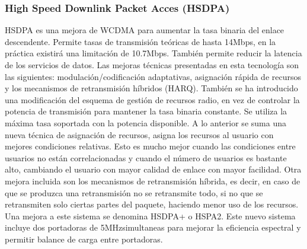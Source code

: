 \subsubsection{High Speed Downlink Packet Acces (\acrshort{HSDPA})}
\label{ssub:HSDPA}
\acrshort{HSDPA} es una mejora de WCDMA para aumentar la tasa binaria del enlace descendente. Permite tasas de transmisión teóricas de hasta 14Mbps, en la práctica existirá una limitación de 10.7Mbps. También permite reducir la latencia de los servicios de datos. Las mejoras técnicas presentadas en esta tecnología son las siguientes: modulación/codificación adaptativas, asignación rápida de recursos y los mecanismos de retransmisión híbridos (\acrshort{HARQ}). También se ha introducido una modificación del esquema de gestión de recursos radio, en vez de controlar la potencia de transmisión para mantener la tasa binaria constante. Se utiliza la máxima tasa soportada con la potencia disponible. A lo anterior se suma una nueva técnica de asignación de recursos, asigna los recursos al usuario con mejores condiciones relativas. Esto es mucho mejor cuando las condiciones entre usuarios no están correlacionadas y cuando el número de usuarios es bastante alto, cambiando el usuario con mayor calidad de enlace con mayor facilidad. Otra mejora incluida son los mecanismos de retransmisión híbrida, es decir, en caso de que se produzca una retransmisión no se retransmite todo, si no que se retransmiten solo ciertas partes del paquete, haciendo menor uso de los recursos.\\
Una mejora a este sistema se denomina \acrshort{HSDPA}+ o HSPA2. Este nuevo sistema incluye dos portadoras de 5MHzsimultaneas para mejorar la eficiencia espectral y permitir balance de carga entre portadoras.
